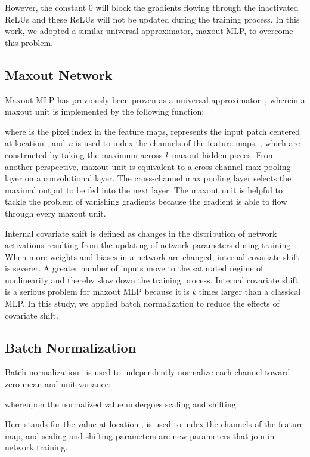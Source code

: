 \documentclass[10pt,twocolumn,letterpaper]{article}
\begin{document}
However, the constant 0 will block the gradients flowing through the inactivated ReLUs and these ReLUs will not be updated during the training process.
In this work, we adopted a similar universal approximator, maxout MLP, to overcome this problem.

\subsection{Maxout Network}
Maxout MLP has previously been proven as a universal approximator~\cite{goodfellow2013maxout}, wherein a maxout unit is implemented by the following function:


where  is the pixel index in the feature maps,  represents the input patch centered at location , and \textit{n} is used to index the channels of the feature maps, , which are constructed by taking the maximum across \textit{k} maxout hidden pieces. From another perspective, maxout unit is equivalent to a cross-channel max pooling layer on a convolutional layer. The cross-channel max pooling layer selects the maximal output to be fed into the next layer. The maxout unit is helpful to tackle the problem of vanishing gradients because the gradient is able to flow through every maxout unit.

Internal covariate shift is defined as changes in the distribution of network activations resulting from the updating of network parameters during training~\cite{ioffe2015batch}. When more weights and biases in a network are changed, internal covariate shift is severer.
A greater number of inputs move to the saturated regime of nonlinearity and thereby slow down the training process. Internal covariate shift is a serious problem for maxout MLP because it is \textit{k} times larger than a classical MLP. In this study, we applied batch normalization to reduce the effects of covariate shift.

\subsection{Batch Normalization}
	Batch normalization~\cite{ioffe2015batch} is used to independently normalize each channel toward zero mean and unit variance:

whereupon the normalized value undergoes scaling and shifting:

Here   stands for the value at location  ,   is used to index the channels of the feature map, and scaling and shifting parameters   are new parameters that join in network training.
\end{document}
